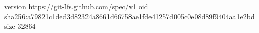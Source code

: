 version https://git-lfs.github.com/spec/v1
oid sha256:a79821c1ded3d82324a8661d66758ae1fde41257d005c0e08d89f9404aa1e2bd
size 32864
